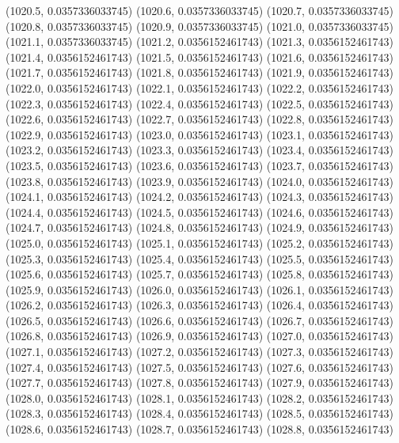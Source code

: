 {					(1020.5, 0.0357336033745)
					(1020.6, 0.0357336033745)
					(1020.7, 0.0357336033745)
					(1020.8, 0.0357336033745)
					(1020.9, 0.0357336033745)
					(1021.0, 0.0357336033745)
					(1021.1, 0.0357336033745)
					(1021.2, 0.0356152461743)
					(1021.3, 0.0356152461743)
					(1021.4, 0.0356152461743)
					(1021.5, 0.0356152461743)
					(1021.6, 0.0356152461743)
					(1021.7, 0.0356152461743)
					(1021.8, 0.0356152461743)
					(1021.9, 0.0356152461743)
					(1022.0, 0.0356152461743)
					(1022.1, 0.0356152461743)
					(1022.2, 0.0356152461743)
					(1022.3, 0.0356152461743)
					(1022.4, 0.0356152461743)
					(1022.5, 0.0356152461743)
					(1022.6, 0.0356152461743)
					(1022.7, 0.0356152461743)
					(1022.8, 0.0356152461743)
					(1022.9, 0.0356152461743)
					(1023.0, 0.0356152461743)
					(1023.1, 0.0356152461743)
					(1023.2, 0.0356152461743)
					(1023.3, 0.0356152461743)
					(1023.4, 0.0356152461743)
					(1023.5, 0.0356152461743)
					(1023.6, 0.0356152461743)
					(1023.7, 0.0356152461743)
					(1023.8, 0.0356152461743)
					(1023.9, 0.0356152461743)
					(1024.0, 0.0356152461743)
					(1024.1, 0.0356152461743)
					(1024.2, 0.0356152461743)
					(1024.3, 0.0356152461743)
					(1024.4, 0.0356152461743)
					(1024.5, 0.0356152461743)
					(1024.6, 0.0356152461743)
					(1024.7, 0.0356152461743)
					(1024.8, 0.0356152461743)
					(1024.9, 0.0356152461743)
					(1025.0, 0.0356152461743)
					(1025.1, 0.0356152461743)
					(1025.2, 0.0356152461743)
					(1025.3, 0.0356152461743)
					(1025.4, 0.0356152461743)
					(1025.5, 0.0356152461743)
					(1025.6, 0.0356152461743)
					(1025.7, 0.0356152461743)
					(1025.8, 0.0356152461743)
					(1025.9, 0.0356152461743)
					(1026.0, 0.0356152461743)
					(1026.1, 0.0356152461743)
					(1026.2, 0.0356152461743)
					(1026.3, 0.0356152461743)
					(1026.4, 0.0356152461743)
					(1026.5, 0.0356152461743)
					(1026.6, 0.0356152461743)
					(1026.7, 0.0356152461743)
					(1026.8, 0.0356152461743)
					(1026.9, 0.0356152461743)
					(1027.0, 0.0356152461743)
					(1027.1, 0.0356152461743)
					(1027.2, 0.0356152461743)
					(1027.3, 0.0356152461743)
					(1027.4, 0.0356152461743)
					(1027.5, 0.0356152461743)
					(1027.6, 0.0356152461743)
					(1027.7, 0.0356152461743)
					(1027.8, 0.0356152461743)
					(1027.9, 0.0356152461743)
					(1028.0, 0.0356152461743)
					(1028.1, 0.0356152461743)
					(1028.2, 0.0356152461743)
					(1028.3, 0.0356152461743)
					(1028.4, 0.0356152461743)
					(1028.5, 0.0356152461743)
					(1028.6, 0.0356152461743)
					(1028.7, 0.0356152461743)
					(1028.8, 0.0356152461743)
}
